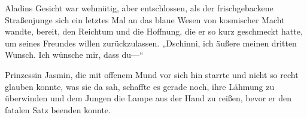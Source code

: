 Aladins Gesicht war wehmütig, aber entschlossen, als der frischgebackene Straßenjunge sich ein letztes Mal an das blaue Wesen von kosmischer Macht wandte, bereit, den Reichtum und die Hoffnung, die er so kurz geschmeckt hatte, um seines Freundes willen zurückzulassen. „Dschinni, ich äußere meinen dritten Wunsch. Ich wünsche mir, dass du—“

Prinzessin Jasmin, die mit offenem Mund vor sich hin starrte und nicht so recht glauben konnte, was sie da sah, schaffte es gerade noch, ihre Lähmung zu überwinden und dem Jungen die Lampe aus der Hand zu reißen, bevor er den fatalen Satz beenden konnte.

